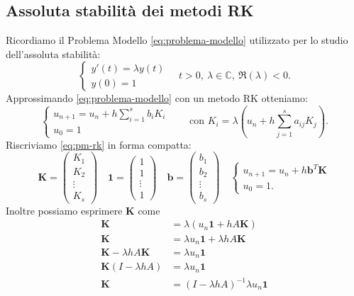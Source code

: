 \subsection{Assoluta stabilità dei metodi RK}
Ricordiamo il Problema Modello \eqref{eq:problema-modello} utilizzato per lo studio dell'assoluta stabilità:
\begin{equation*}\tag{PMod}
\begin{cases}
y'(t) =\lambda y(t)\\
y(0) =1
\end{cases} \quad t >0, \ \lambda \in \mathbb{C}, \ \Re ( \lambda ) < 0.
\end{equation*}
Approssimando \eqref{eq:problema-modello} con un metodo RK otteniamo:
\begin{equation}
\begin{cases}
u_{n+1} =u_{n} +h\sum\limits ^{s}_{i=1} b_{i} K_{i}\\
u_{0} =1
\end{cases} \qquad \text{con } K_{i} =\lambda \left( u_{n} +h\sum\limits ^{s}_{j=1} a_{ij} K_{j}\right).
\label{eq:pm-rk}
\end{equation}
Riscriviamo \eqref{eq:pm-rk} in forma compatta:
\begin{equation*}
\mathbf{K} =\begin{pmatrix}
K_{1}\\
K_{2}\\
\vdots \\
K_{s}
\end{pmatrix} \quad \mathbf{1} =\begin{pmatrix}
1\\
1\\
\vdots \\
1
\end{pmatrix} \quad \mathbf{b} =\begin{pmatrix}
b_{1}\\
b_{2}\\
\vdots \\
b_{s}
\end{pmatrix} \quad \begin{cases}
u_{n+1} =u_{n} +h\mathbf{b}^{T}\mathbf{K}\\
u_{0} =1.
\end{cases}
\end{equation*}
Inoltre possiamo esprimere $\mathbf{K}$ come
\begin{align*}
\mathbf{K} & =\lambda ( u_{n}\mathbf{1} +hA\mathbf{K})\\
\mathbf{K} & =\lambda u_{n}\mathbf{1} +\lambda hA\mathbf{K}\\
\mathbf{K} -\lambda hA\mathbf{K} & =\lambda u_{n}\mathbf{1}\\
\mathbf{K}( I-\lambda hA) & =\lambda u_{n}\mathbf{1}\\
\mathbf{K} & =( I-\lambda hA)^{-1} \lambda u_{n}\mathbf{1}
\end{align*}
